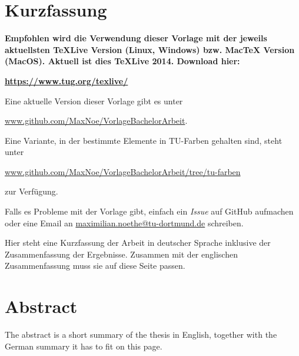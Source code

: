 \thispagestyle{plain}
\section*{Kurzfassung}

\textbf{\large Empfohlen wird die Verwendung dieser Vorlage mit der jeweils aktuellsten TeXLive Version (Linux, Windows) bzw. MacTeX Version (MacOS).
Aktuell ist dies TeXLive 2014. Download hier: }

\href{https://www.tug.org/texlive/}{\textbf{\large https://www.tug.org/texlive/}}

Eine aktuelle Version dieser Vorlage gibt es unter 

\href{https://github.com/MaxNoe/VorlageBachelorArbeit}{www.github.com/MaxNoe/VorlageBachelorArbeit}.

Eine Variante, in der bestimmte Elemente in TU-Farben gehalten sind, steht unter 

\href{https://github.com/MaxNoe/VorlageBachelorArbeit/tree/tu-farben}{www.github.com/MaxNoe/VorlageBachelorArbeit/tree/tu-farben}  

zur Verfügung.

Falls es Probleme mit der Vorlage gibt, einfach ein \emph{Issue} auf GitHub aufmachen oder eine Email an
\href{mailto:maximilian.noethe@tu-dortmund.de}{maximilian.noethe@tu-dortmund.de} schreiben.


Hier steht eine Kurzfassung der Arbeit in deutscher Sprache inklusive der Zusammenfassung der
Ergebnisse.
Zusammen mit der englischen Zusammenfassung muss sie auf diese Seite passen.

\section*{Abstract}

The abstract is a short summary of the thesis in English, together with the German summary it has to fit on this page.

